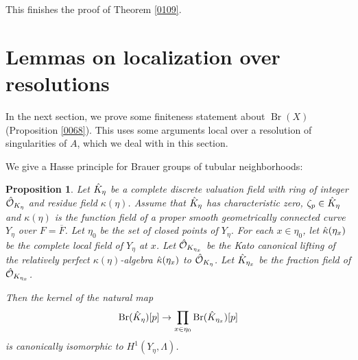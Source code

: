 \documentclass{amsart}
\newtheorem{Prop}[Thm]{Proposition}
\theoremstyle{remark}
\numberwithin{equation}{section}
\newcommand{\Order}{\mathcal{O}}
\newcommand{\closure}[1]{\overline{#1}}
\DeclareMathOperator{\Br}{Br}
\begin{document}
This finishes the proof of Theorem \ref{0109}.


\section{Lemmas on localization over resolutions}
\label{0117}

In the next section,
we prove some finiteness statement about $\Br(X)$
(Proposition \ref{0068}).
This uses some arguments local over a resolution of singularities of $A$,
which we deal with in this section.

We give a Hasse principle for Brauer groups of tubular neighborhoods:

\begin{Prop} \label{0067}
	Let $\Hat{K}_{\eta}$ be a complete discrete valuation field
	with ring of integer $\Hat{\Order}_{K_{\eta}}$ and residue field $\kappa(\eta)$.
	Assume that $\Hat{K}_{\eta}$ has characteristic zero, $\zeta_{p} \in \Hat{K}_{\eta}$ and
	$\kappa(\eta)$ is the function field
	of a proper smooth geometrically connected curve $Y_{\eta}$ over $F = \closure{F}$.
	Let $\eta_{0}$ be the set of closed points of $Y_{\eta}$.
	For each $x \in \eta_{0}$,
	let $\Hat{\kappa}(\eta_{x})$ be the complete local field of $Y_{\eta}$ at $x$.
	Let $\Hat{\Order}_{K_{\eta_{x}}}$ be the Kato canonical lifting of
	the relatively perfect $\kappa(\eta)$-algebra $\Hat{\kappa}(\eta_{x})$ to $\Hat{\Order}_{K_{\eta}}$.
	Let $\Hat{K}_{\eta_{x}}$ be the fraction field of $\Hat{\Order}_{K_{\eta_{x}}}$.
	
	Then the kernel of the natural map
		\begin{equation} \label{0064}
				\Br(\Hat{K}_{\eta})[p]
			\to
				\prod_{x \in \eta_{0}}
					\Br(\Hat{K}_{\eta_{x}})[p]
		\end{equation}
	is canonically isomorphic to $H^{1}(Y_{\eta}, \Lambda)$.
\end{Prop}
\end{document}
